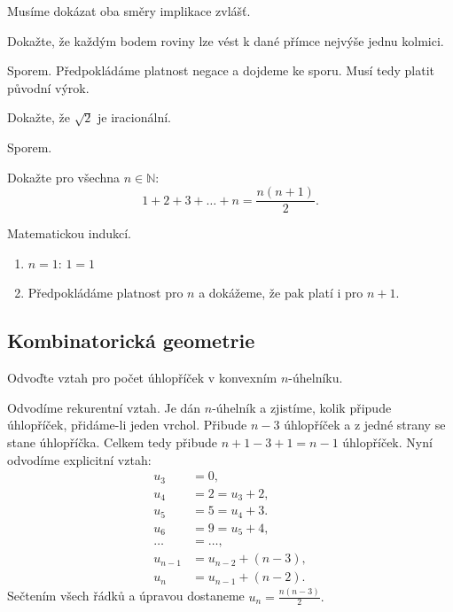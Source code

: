 \begin{reseni}
Musíme dokázat oba směry implikace zvlášť.
\end{reseni}

\begin{priklad}
Dokažte, že každým bodem roviny lze vést k dané přímce nejvýše jednu kolmici.
\end{priklad}

\begin{reseni}
Sporem. Předpokládáme platnost negace a dojdeme ke sporu. Musí tedy platit původní výrok.
\end{reseni}

\begin{priklad}
Dokažte, že $\sqrt{2} $ je iracionální.
\end{priklad}

\begin{reseni}
Sporem.
\end{reseni}

\begin{priklad}
Dokažte pro všechna $n\in \mathbb N: $
$$1+2+3+\dots+n=\frac{n(n+1)}{2}.$$
\end{priklad}

\begin{reseni}
Matematickou indukcí.
\begin{enumerate}[1.]
\item $n=1$: $1=1$
\item Předpokládáme platnost pro $n$ a dokážeme, že pak platí i pro $n+1$.
\end{enumerate}
\end{reseni}

\subsection{Kombinatorická geometrie}
\begin{priklad}
Odvoďte vztah pro počet úhlopříček v konvexním $n$-úhelníku.
\end{priklad}

\begin{reseni}
Odvodíme rekurentní vztah. Je dán $n$-úhelník a zjistíme, kolik připude
úhlopříček, přidáme-li jeden vrchol. Přibude $n-3$ úhlopříček a z jedné strany
se stane úhlopříčka. Celkem tedy přibude $n+1-3+1=n-1$ úhlopříček. Nyní odvodíme
explicitní vztah:
\begin{align*}
    u_3 &= 0,\\
    u_4 &= 2=u_3+2,\\
    u_5 &= 5=u_4+3. \\
    u_6&=9=u_5+4,\\
    \dots &= \dots, \\
    u_{n-1}&=u_{n-2}+(n-3),\\
    u_n &= u_{n-1}+(n-2).
\end{align*}
Sečtením všech řádků a úpravou dostaneme $u_n=\frac{n(n-3)}{2}.$
\end{reseni}

